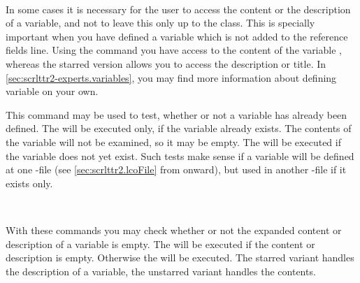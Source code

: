 \begin{Declaration}
  \\
\end{Declaration}
%
%
In some cases it is necessary for the user
to access the content or the description of a variable, and not to leave this
only up to the class. This is specially important when you have defined a
variable which is not added to the reference fields line. Using the command
 you have access to the content of the variable
, whereas the starred version  allows you to
access the description or title. In \autoref{sec:scrlttr2-experts.variables},
 you may find more
information about defining variable on your own.%
%
%


\begin{Declaration}
\end{Declaration}
%
This command may be used to test, whether
or not a variable has already been defined. The  will be
executed only, if the variable already exists. The contents of the variable
will not be examined, so it may be empty. The  will be
executed if the variable does not yet exist. Such tests make sense if a
variable will be defined at one
-file (see
\autoref{sec:scrlttr2.lcoFile} from 
onward), but used in another -file if it exists only.%
%
%


\begin{Declaration}
    \\
\end{Declaration}
%
%
With these commands you may check
whether or not the expanded content or description of a variable is
empty. The  will be executed if the content or
description is empty. Otherwise the  will be
executed. The starred variant handles the description of a variable,
the unstarred variant handles the contents.%
%
%
%
%


